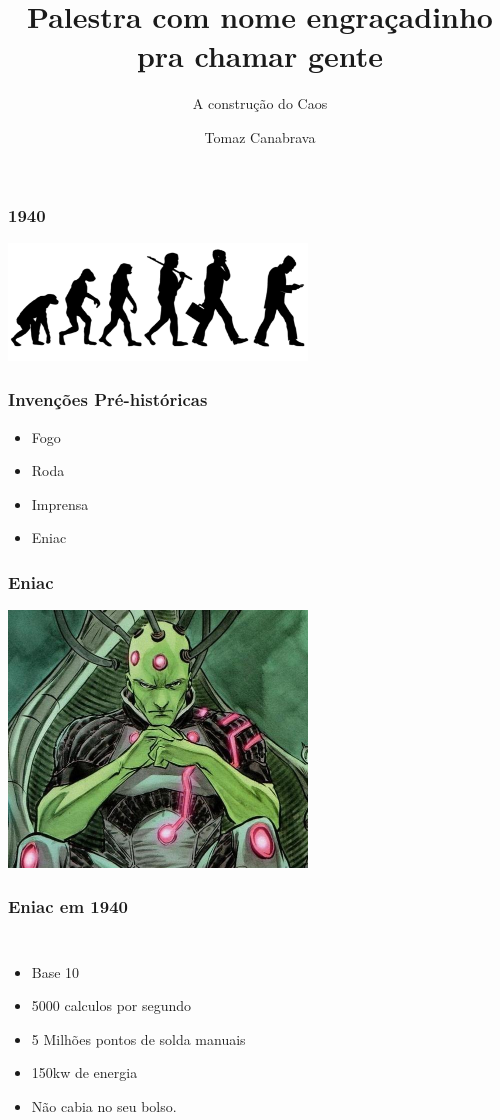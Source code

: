 \documentclass{beamer}
\title{ Palestra com nome engraçadinho pra chamar gente }
\subtitle{ A construção do Caos }
\author{ Tomaz Canabrava }
\begin{document}
\begin{frame} \titlepage \end{frame}

\begin{frame} \frametitle{1940}
    \includegraphics[width=300px]{images/evolution}
\end{frame}

\begin{frame} \frametitle{Invenções Pré-históricas}
    \begin{itemize}
     \item Fogo
     \item Roda
     \item Imprensa
     \pause
     \item Eniac
    \end{itemize}
\end{frame}

\begin{frame} \frametitle{Eniac}
    \includegraphics[width=300px]{images/eniac}
\end{frame}

\begin{frame} \frametitle{Eniac em 1940}
    \begin{columns}
    \begin{itemize}
        \item Base 10
        \pause
        \item 5000 calculos por segundo
        \pause
        \item 5 Milhões pontos de solda manuais
        \pause
        \item 150kw de energia
        \pause
        \item Não cabia no seu bolso.
    \end{itemize}
    \end{columns}
\end{frame}
\end{document}
